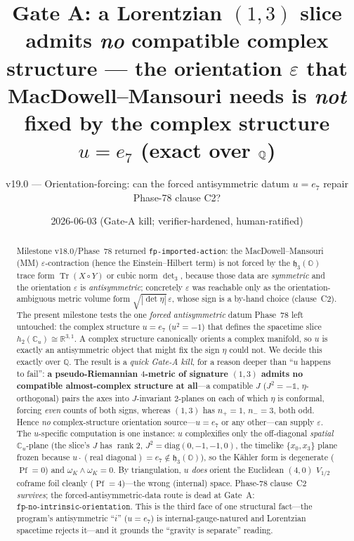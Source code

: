 \documentclass[11pt]{article}
\title{Gate A: a Lorentzian $(1,3)$ slice admits \emph{no} compatible complex
structure --- the orientation $\varepsilon$ that MacDowell--Mansouri needs is
\emph{not} fixed by the complex structure $u=e_7$ (exact over $\Q$)}
\author{v19.0 --- Orientation-forcing: can the forced antisymmetric datum $u=e_7$
repair Phase-78 clause C2?}
\date{2026-06-03 (Gate-A kill; verifier-hardened, human-ratified)}
\newcommand{\R}{\mathbb{R}}
\newcommand{\Q}{\mathbb{Q}}
\newcommand{\OO}{\mathbb{O}}
\newcommand{\Cu}{\mathbb{C}_u}
\newcommand{\Tr}{\operatorname{Tr}}
\newcommand{\hh}{\mathfrak{h}}
\newcommand{\id}{\mathbb{1}}
\DeclareMathOperator{\Pf}{Pf}
\DeclareMathOperator{\rank}{rank}
\theoremstyle{plain}\newtheorem{theorem}{Theorem}
\theoremstyle{plain}\newtheorem{proposition}{Proposition}
\theoremstyle{plain}\newtheorem{corollary}{Corollary}
\theoremstyle{definition}\newtheorem{remark}{Remark}
\begin{document}
\maketitle

\begin{abstract}
Milestone v18.0/Phase~78 returned \texttt{fp-imported-action}: the MacDowell--Mansouri
(MM) $\varepsilon$-contraction (hence the Einstein--Hilbert term) is not forced by the
$\hh_3(\OO)$ trace form $\Tr(X\circ Y)$ or cubic norm $\det\nolimits_3$, because those data
are \emph{symmetric} and the orientation $\varepsilon$ is \emph{antisymmetric}; concretely
$\varepsilon$ was reachable only as the orientation-ambiguous metric volume form
$\sqrt{|\det\eta|}\,\varepsilon$, whose sign is a by-hand choice (clause~C2). The present
milestone tests the one \emph{forced antisymmetric} datum Phase~78 left untouched: the
complex structure $u=e_7$ ($u^2=-1$) that defines the spacetime slice $h_2(\Cu)\cong\R^{3,1}$.
A complex structure canonically orients a complex manifold, so $u$ is exactly an
antisymmetric object that might fix the sign $\eta$ could not. We decide this exactly over
$\Q$. The result is a \emph{quick Gate-A kill}, for a reason deeper than ``$u$ happens to
fail'': \textbf{a pseudo-Riemannian $4$-metric of signature $(1,3)$ admits no compatible
almost-complex structure at all}---a compatible $J$ ($J^2=-\id$, $\eta$-orthogonal) pairs
the axes into $J$-invariant $2$-planes on each of which $\eta$ is conformal, forcing
\emph{even} counts of both signs, whereas $(1,3)$ has $n_+=1,\,n_-=3$, both odd. Hence
\emph{no} complex-structure orientation source---$u=e_7$ or any other---can supply
$\varepsilon$. The $u$-specific computation is one instance: $u$ complexifies only the
off-diagonal \emph{spatial} $\Cu$-plane (the slice's $J$ has $\rank 2$,
$J^2=\mathrm{diag}(0,-1,-1,0)$, the timelike $\{x_0,x_3\}$ plane frozen because
$u\cdot(\text{real diagonal})=e_7\notin\hh_3(\OO)$), so the K\"ahler form is degenerate
($\Pf=0$) and $\omega_K\wedge\omega_K=0$. By triangulation, $u$ \emph{does} orient the
Euclidean $(4,0)$ $V_{1/2}$ coframe foil cleanly ($\Pf=4$)---the wrong (internal) space.
Phase-78 clause~C2 \emph{survives}; the forced-antisymmetric-data route is dead at Gate~A:
$\boxed{\texttt{fp-no-intrinsic-orientation}}$. This is the third face of one structural
fact---the program's antisymmetric ``$i$'' ($u=e_7$) is internal-gauge-natured and
Lorentzian spacetime rejects it---and it grounds the ``gravity is separate'' reading.
\end{abstract}
\end{document}
